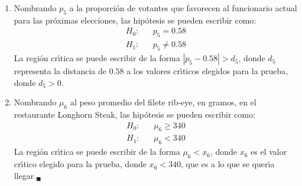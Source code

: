 \begin{solucion}
\begin{enumerate}
  \item Nombrando $p_5$ a la proporci\'on de votantes que favorecen
  al funcionario actual para las pr\'oximas elecciones,
  las hip\'otesis se pueden escribir como:
  \begin{eqnarray*}
   H_0: & & p_5   =  0.58 \\
   H_1: & & p_5 \neq 0.58
  \end{eqnarray*}
  La regi\'on cr\'{\i}tica se puede escribir
  de la forma $\left| p_5 - 0.58 \right|  > d_5$,
  donde $d_5$ representa la distancia de $0.58$ a los valores cr\'{\i}ticos
  elegidos para la prueba, donde $d_5 > 0$.
  
  \item Nombrando $\mu_6$ al peso promedio del filete rib-eye, en gramos,
  en el restaurante Longhorn Steak,
  las hip\'otesis se pueden escribir como:
  \begin{eqnarray*}
   H_0: & & \mu_6 \geq 340 \\
   H_1: & & \mu_6   <  340
  \end{eqnarray*}
  La regi\'on cr\'{\i}tica se puede escribir de la forma $\mu_6 < x_6$,
  donde $x_6$ es el valor cr\'{\i}tico elegido para la prueba,
  donde $x_6 < 340$,
  que es a lo que se quer\'{\i}a llegar.${}_{\blacksquare}$
 \end{enumerate}

\end{solucion}
